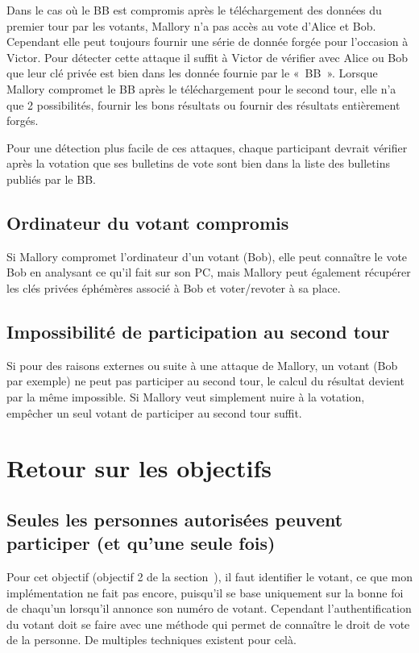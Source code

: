 \documentclass[../report]{subfiles}
\begin{document}
Dans le cas où le BB est compromis après le téléchargement des données du premier tour par les votants, Mallory n'a pas accès au vote
d'Alice et Bob.
Cependant elle peut toujours fournir une série de donnée forgée pour l'occasion à Victor. 
Pour détecter cette attaque il suffit à Victor de vérifier avec Alice ou Bob que leur clé privée est bien dans les donnée fournie par le «~BB~». 
Lorsque Mallory compromet le BB après le téléchargement pour le second tour, elle n'a que 2 possibilités, fournir les bons résultats 
ou fournir des résultats entièrement forgés.

Pour une détection plus facile de ces attaques, chaque participant devrait vérifier après la votation que ses bulletins de vote sont bien dans la liste
des bulletins publiés par le BB.

\section{Ordinateur du votant compromis}

Si Mallory compromet l'ordinateur d'un votant (Bob), elle peut connaître le vote Bob en analysant ce qu'il fait sur son PC, 
mais Mallory peut également récupérer les clés privées éphémères associé à Bob et voter/revoter à sa place.

\section{Impossibilité de participation au second tour}

Si pour des raisons externes ou suite à une attaque de Mallory, un votant (Bob par exemple) ne peut pas participer au second tour, le 
calcul du résultat devient par la même impossible. Si Mallory veut simplement nuire à la votation, empêcher un seul votant 
de participer au second tour suffit.

\chapter{Retour sur les objectifs}

\section{Seules les personnes autorisées peuvent participer (et qu'une seule fois)}

Pour cet objectif (objectif 2 de la section~),
il faut identifier le votant, ce que mon implémentation ne fait pas encore, puisqu'il se base 
uniquement sur la bonne foi de chaqu'un lorsqu'il annonce son numéro de votant.
Cependant l'authentification du votant doit se faire avec une méthode qui permet de connaître
le droit de vote de la personne. De multiples techniques existent pour celà.
\end{document}
